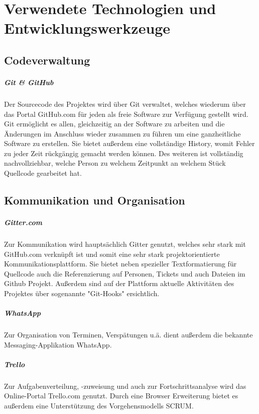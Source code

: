 \documentclass[11pt]{scrreprt}
\begin{document}
\chapter{Verwendete Technologien und Entwicklungswerkzeuge}
\section{Codeverwaltung}
\paragraph{Git \& GitHub}
Der Sourcecode des Projektes wird über Git verwaltet, welches wiederum über das Portal GitHub.com für jeden als freie Software zur Verf\"ugung gestellt wird.
Git ermöglicht es allen, gleichzeitig an der Software zu arbeiten und die \"Anderungen im Anschluss wieder zusammen zu f\"uhren um eine ganzheitliche Software zu erstellen. Sie bietet außerdem eine vollst\"andige History, womit Fehler zu jeder Zeit r\"uckg\"angig gemacht werden k\"onnen.
Des weiteren ist vollst\"andig nachvollziehbar, welche Person zu welchem Zeitpunkt an welchem St\"uck Quellcode gearbeitet hat.

\section{Kommunikation und Organisation}
\paragraph{Gitter.com}
Zur Kommunikation wird haupts\"achlich Gitter genutzt, welches sehr stark mit GitHub.com verkn\"upft ist und somit eine sehr stark projektorientierte Kommunikationsplattform. Sie bietet neben spezieller Textformatierung f\"ur Quellcode auch die Referenzierung auf Personen, Tickets und auch Dateien im Github Projekt. Außerdem sind auf der Plattform aktuelle Aktivit\"aten des Projektes \"uber sogenannte "Git-Hooks" ersichtlich.
\paragraph{WhatsApp}
Zur Organisation von Terminen, Versp\"atungen u.ä. dient außerdem die bekannte Messaging-Applikation WhatsApp.
\paragraph{Trello}
Zur Aufgabenverteilung, -zuweisung und auch zur Fortschrittsanalyse wird das Online-Portal Trello.com genutzt. Durch eine Browser Erweiterung bietet es außerdem eine Unterstützung des Vorgehensmodells SCRUM.
\end{document}

